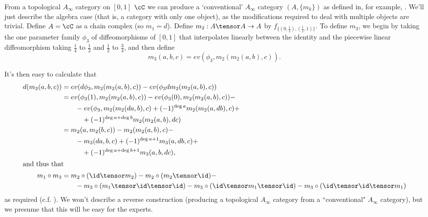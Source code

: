{From a topological $A_\infty$ category on $[0,1]$ $\cC$ we can produce a `conventional' 
$A_\infty$ category $(A, \{m_k\})$ as defined in, for example, \cite{MR1854636}.
We'll just describe the algebra case (that is, a category with only one object), 
as the modifications required to deal with multiple objects are trivial.
Define $A = \cC$ as a chain complex (so $m_1 = d$).
Define $m_2 : A\tensor A \to A$ by $f_{\{(0,\frac{1}{2}),(\frac{1}{2},1)\}}$.
To define $m_3$, we begin by taking the one parameter family $\phi_3$ of diffeomorphisms 
of $[0,1]$ that interpolates linearly between the identity and the piecewise linear 
diffeomorphism taking $\frac{1}{4}$ to $\frac{1}{2}$ and $\frac{1}{2}$ to $\frac{3}{4}$, and then define
\begin{equation*}
m_3(a,b,c) = ev(\phi_3, m_2(m_2(a,b), c)).
\end{equation*}

It's then easy to calculate that
\begin{align*}
d(m_3(a,b,c)) & = ev(d \phi_3, m_2(m_2(a,b),c)) - ev(\phi_3 d m_2(m_2(a,b), c)) \\
 & = ev( \phi_3(1), m_2(m_2(a,b),c)) - ev(\phi_3(0), m_2 (m_2(a,b),c)) - \\ & \qquad - ev(\phi_3, m_2(m_2(da, b), c) + (-1)^{\deg a} m_2(m_2(a, db), c) + \\ & \qquad \quad + (-1)^{\deg a+\deg b} m_2(m_2(a, b), dc) \\
 & = m_2(a , m_2(b,c)) - m_2(m_2(a,b),c) - \\ & \qquad - m_3(da,b,c) + (-1)^{\deg a + 1} m_3(a,db,c) + \\ & \qquad \quad + (-1)^{\deg a + \deg b + 1} m_3(a,b,dc), \\
\intertext{and thus that}
m_1 \circ m_3 & =  m_2 \circ (\id \tensor m_2) - m_2 \circ (m_2 \tensor \id) - \\ & \qquad - m_3 \circ (m_1 \tensor \id \tensor \id) - m_3 \circ (\id \tensor m_1 \tensor \id) - m_3 \circ (\id \tensor \id \tensor m_1)
\end{align*}
as required (c.f. \cite[p. 6]{MR1854636}).
We won't describe a reverse construction (producing a topological $A_\infty$ category 
from a ``conventional" $A_\infty$ category), but we presume that this will be easy for the experts.

} %